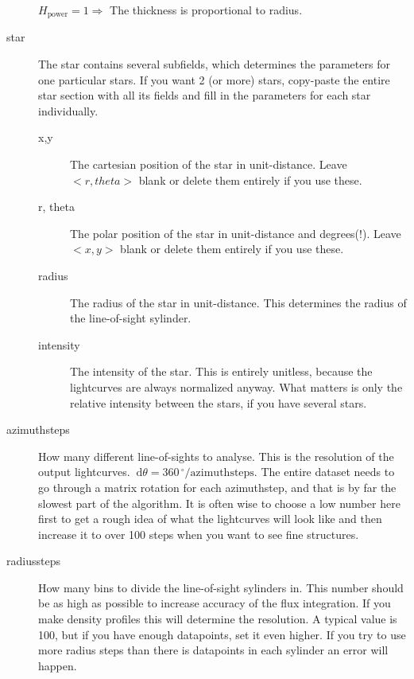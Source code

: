 \documentclass[a4paper, 12pt, english, titlepage]{article}
\newcommand{\D}[1]{\ \mathrm{d}#1} %
\newcommand{\degree}{\, ^\circ}    %
\begin{document}
\begin{description}
            $H_\textrm{power} = 1 \Rightarrow$ The thickness is proportional to radius.
        \item[star]
            The star contains several subfields, which determines the parameters for one particular stars. If you want 2 (or more) stars, copy-paste the entire star section with all its fields and fill in the parameters for each star individually.
            \begin{description}
                \item[x,y]
                    The cartesian position of the star in unit-distance.
                    Leave $<r,theta>$ blank or delete them entirely if you use these.
                \item[r, theta]
                    The polar position of the star in unit-distance and degrees(!).
                    Leave $<x,y>$ blank or delete them entirely if you use these.
                \item[radius]
                    The radius of the star in unit-distance. This determines the radius of the line-of-sight sylinder.
                \item[intensity]
                    The intensity of the star. This is entirely unitless, because the lightcurves are always normalized anyway. What matters is only the relative intensity between the stars, if you have several stars.
            \end{description}

        \item[azimuthsteps]
            How many different line-of-sights to analyse. This is the resolution of the output lightcurves. $\D \theta = 360\degree / \textrm{azimuthsteps}$. The entire dataset needs to go through a matrix rotation for each azimuthstep, and that is by far the slowest part of the algorithm. It is often wise to choose a low number here first to get a rough idea of what the lightcurves will look like and then increase it to over 100 steps when you want to see fine structures.
        \item[radiussteps]
            How many bins to divide the line-of-sight sylinders in. This number should be as high as possible to increase accuracy of the flux integration. If you make density profiles this will determine the resolution. A typical value is 100, but if you have enough datapoints, set it even higher. If you try to use more radius steps than there is datapoints in each sylinder an error will happen.
    \end{description}
\end{document}
